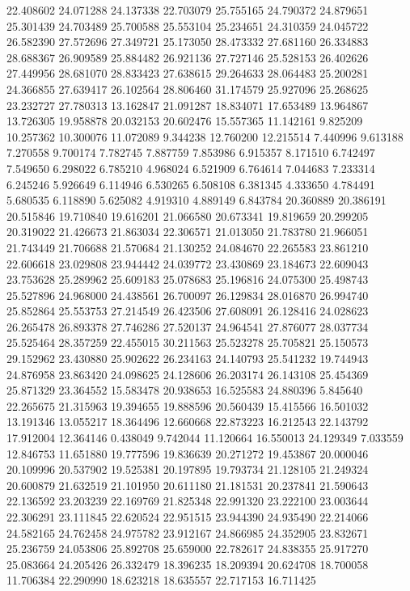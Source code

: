 22.408602
24.071288
24.137338
22.703079
25.755165
24.790372
24.879651
25.301439
24.703489
25.700588
25.553104
25.234651
24.310359
24.045722
26.582390
27.572696
27.349721
25.173050
28.473332
27.681160
26.334883
28.688367
26.909589
25.884482
26.921136
27.727146
25.528153
26.402626
27.449956
28.681070
28.833423
27.638615
29.264633
28.064483
25.200281
24.366855
27.639417
26.102564
28.806460
31.174579
25.927096
25.268625
23.232727
27.780313
13.162847
21.091287
18.834071
17.653489
13.964867
13.726305
19.958878
20.032153
20.602476
15.557365
11.142161
9.825209
10.257362
10.300076
11.072089
9.344238
12.760200
12.215514
7.440996
9.613188
7.270558
9.700174
7.782745
7.887759
7.853986
6.915357
8.171510
6.742497
7.549650
6.298022
6.785210
4.968024
6.521909
6.764614
7.044683
7.233314
6.245246
5.926649
6.114946
6.530265
6.508108
6.381345
4.333650
4.784491
5.680535
6.118890
5.625082
4.919310
4.889149
6.843784
20.360889
20.386191
20.515846
19.710840
19.616201
21.066580
20.673341
19.819659
20.299205
20.319022
21.426673
21.863034
22.306571
21.013050
21.783780
21.966051
21.743449
21.706688
21.570684
21.130252
24.084670
22.265583
23.861210
22.606618
23.029808
23.944442
24.039772
23.430869
23.184673
22.609043
23.753628
25.289962
25.609183
25.078683
25.196816
24.075300
25.498743
25.527896
24.968000
24.438561
26.700097
26.129834
28.016870
26.994740
25.852864
25.553753
27.214549
26.423506
27.608091
26.128416
24.028623
26.265478
26.893378
27.746286
27.520137
24.964541
27.876077
28.037734
25.525464
28.357259
22.455015
30.211563
25.523278
25.705821
25.150573
29.152962
23.430880
25.902622
26.234163
24.140793
25.541232
19.744943
24.876958
23.863420
24.098625
24.128606
26.203174
26.143108
25.454369
25.871329
23.364552
15.583478
20.938653
16.525583
24.880396
5.845640
22.265675
21.315963
19.394655
19.888596
20.560439
15.415566
16.501032
13.191346
13.055217
18.364496
12.660668
22.873223
16.212543
22.143792
17.912004
12.364146
0.438049
9.742044
11.120664
16.550013
24.129349
7.033559
12.846753
11.651880
19.777596
19.836639
20.271272
19.453867
20.000046
20.109996
20.537902
19.525381
20.197895
19.793734
21.128105
21.249324
20.600879
21.632519
21.101950
20.611180
21.181531
20.237841
21.590643
22.136592
23.203239
22.169769
21.825348
22.991320
23.222100
23.003644
22.306291
23.111845
22.620524
22.951515
23.944390
24.935490
22.214066
24.582165
24.762458
24.975782
23.912167
24.866985
24.352905
23.832671
25.236759
24.053806
25.892708
25.659000
22.782617
24.838355
25.917270
25.083664
24.205426
26.332479
18.396235
18.209394
20.624708
18.700058
11.706384
22.290990
18.623218
18.635557
22.717153
16.711425

